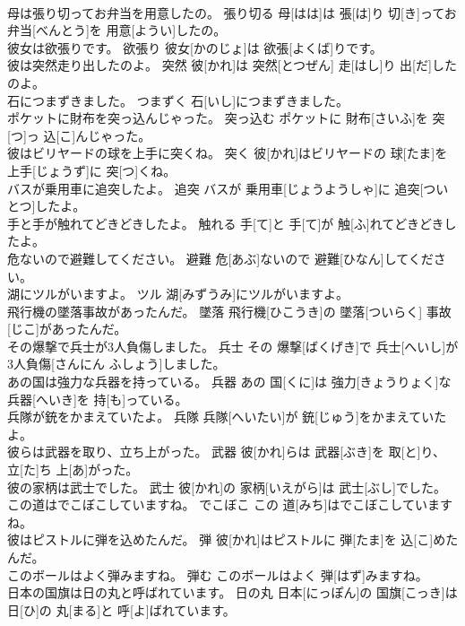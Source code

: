 \documentclass[8pt]{extreport}
\begin{document}
\begin{CJK}{UTF8}{min}
\\	母は張り切ってお弁当を用意したの。	張り切る	母[はは]は 張[は]り 切[き]ってお 弁当[べんとう]を 用意[ようい]したの。	
\\	彼女は欲張りです。	欲張り	彼女[かのじょ]は 欲張[よくば]りです。	
\\	彼は突然走り出したのよ。	突然	彼[かれ]は 突然[とつぜん] 走[はし]り 出[だ]したのよ。	
\\	石につまずきました。	つまずく	石[いし]につまずきました。	
\\	ポケットに財布を突っ込んじゃった。	突っ込む	ポケットに 財布[さいふ]を 突[つ]っ 込[こ]んじゃった。	
\\	彼はビリヤードの球を上手に突くね。	突く	彼[かれ]はビリヤードの 球[たま]を 上手[じょうず]に 突[つ]くね。	
\\	バスが乗用車に追突したよ。	追突	バスが 乗用車[じょうようしゃ]に 追突[ついとつ]したよ。	
\\	手と手が触れてどきどきしたよ。	触れる	手[て]と 手[て]が 触[ふ]れてどきどきしたよ。	
\\	危ないので避難してください。	避難	危[あぶ]ないので 避難[ひなん]してください。	
\\	湖にツルがいますよ。	ツル	湖[みずうみ]にツルがいますよ。	
\\	飛行機の墜落事故があったんだ。	墜落	飛行機[ひこうき]の 墜落[ついらく] 事故[じこ]があったんだ。	
\\	その爆撃で兵士が3人負傷しました。	兵士	その 爆撃[ばくげき]で 兵士[へいし]が 3人負傷[さんにん ふしょう]しました。	
\\	あの国は強力な兵器を持っている。	兵器	あの 国[くに]は 強力[きょうりょく]な 兵器[へいき]を 持[も]っている。	
\\	兵隊が銃をかまえていたよ。	兵隊	兵隊[へいたい]が 銃[じゅう]をかまえていたよ。	
\\	彼らは武器を取り、立ち上がった。	武器	彼[かれ]らは 武器[ぶき]を 取[と]り、 立[た]ち 上[あ]がった。	
\\	彼の家柄は武士でした。	武士	彼[かれ]の 家柄[いえがら]は 武士[ぶし]でした。	
\\	この道はでこぼこしていますね。	でこぼこ	この 道[みち]はでこぼこしていますね。	
\\	彼はピストルに弾を込めたんだ。	弾	彼[かれ]はピストルに 弾[たま]を 込[こ]めたんだ。	
\\	このボールはよく弾みますね。	弾む	このボールはよく 弾[はず]みますね。	
\\	日本の国旗は日の丸と呼ばれています。	日の丸	日本[にっぽん]の 国旗[こっき]は 日[ひ]の 丸[まる]と 呼[よ]ばれています。	

\end{CJK}
\end{document}
